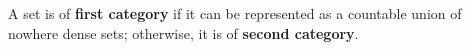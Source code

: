 A set is of \textbf{first category} if it can be represented as a countable union of nowhere dense sets; otherwise, it is of \textbf{second category}.

